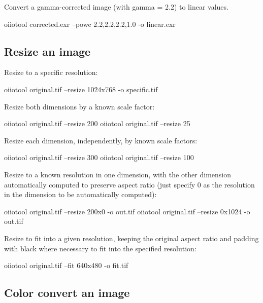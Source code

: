 Convert a gamma-corrected image (with gamma = 2.2) to linear values.

\begin{code}
    oiiotool corrected.exr --powc 2.2,2.2,2.2,1.0 -o linear.exr
\end{code}

\subsection*{Resize an image}

\noindent Resize to a specific resolution:

\begin{code}
    oiiotool original.tif --resize 1024x768 -o specific.tif
\end{code}

\noindent Resize both dimensions by a known scale factor:

\begin{code}
    oiiotool original.tif --resize 200%
    oiiotool original.tif --resize 25%
\end{code}

\noindent Resize each dimension, independently, by known scale factors:

\begin{code}
    oiiotool original.tif --resize 300%
    oiiotool original.tif --resize 100%
\end{code}

\noindent Resize to a known resolution in one dimension, with the other dimension
automatically computed to preserve aspect ratio (just specify 0 as the
resolution in the dimension to be automatically computed):

\begin{code}
    oiiotool original.tif --resize 200x0 -o out.tif
    oiiotool original.tif --resize 0x1024 -o out.tif
\end{code}

\noindent Resize to fit into a given resolution, keeping the original
aspect ratio and padding with black where necessary to fit into the
specified resolution:

\begin{code}
    oiiotool original.tif --fit 640x480 -o fit.tif
\end{code}


\subsection*{Color convert an image}

